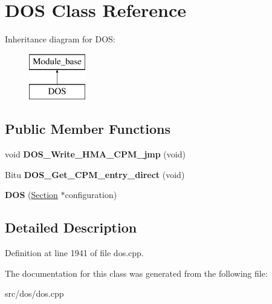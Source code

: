 \hypertarget{classDOS}{\section{D\-O\-S Class Reference}
\label{classDOS}
}
Inheritance diagram for D\-O\-S\-:\begin{figure}[H]
\begin{center}
\leavevmode
\includegraphics[height=2.000000cm]{classDOS}
\end{center}
\end{figure}
\subsection*{Public Member Functions}
\begin{DoxyCompactItemize}
\item 
\hypertarget{classDOS_a298dcab5e49ceecb15a2c1d9c4871866}{void {\bfseries D\-O\-S\-\_\-\-Write\-\_\-\-H\-M\-A\-\_\-\-C\-P\-M\-\_\-jmp} (void)}\label{classDOS_a298dcab5e49ceecb15a2c1d9c4871866}

\item 
\hypertarget{classDOS_a1fd7a02e49365782f597f1e4e0d67779}{Bitu {\bfseries D\-O\-S\-\_\-\-Get\-\_\-\-C\-P\-M\-\_\-entry\-\_\-direct} (void)}\label{classDOS_a1fd7a02e49365782f597f1e4e0d67779}

\item 
\hypertarget{classDOS_ad9dde79e7c7a3940e8aec707edc6e4ac}{{\bfseries D\-O\-S} (\hyperlink{classSection}{Section} $\ast$configuration)}\label{classDOS_ad9dde79e7c7a3940e8aec707edc6e4ac}

\end{DoxyCompactItemize}


\subsection{Detailed Description}


Definition at line 1941 of file dos.\-cpp.



The documentation for this class was generated from the following file\-:\begin{DoxyCompactItemize}
\item 
src/dos/dos.\-cpp\end{DoxyCompactItemize}
